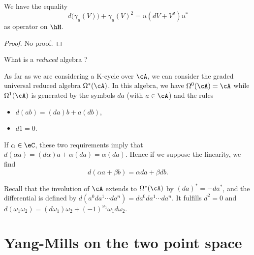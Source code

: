 \begin{proposition}
 We have the equality
\[ 
  d\big( \gamma_u(V) \big)+\gamma_u(V)^2=u(dV+V^2)u^*
\]
as operator on $\hH$.
\end{proposition}
\begin{proof}
No proof.
\end{proof}

\begin{probleme}
	What is a \emph{reduced} algebra ?
\end{probleme}

As far as we are considering a K-cycle over $\cA$, we can consider the graded universal reduced algebra $\Omega^*(\cA)$. In this algebra, we have $\Omega^0(\cA)=\cA$ while $\Omega^1(\cA)$ is generated by the symbols $da$ (with $a\in\cA$) and the rules
\begin{itemize}
\item $d(ab)=(da)b+a(db)$,
\item $d1=0$.
\end{itemize}
If $\alpha\in\eC$, these two requirements imply that $d(\alpha a)=(d\alpha)a+\alpha(da)=\alpha(da)$. Hence if we suppose the linearity, we find
\[ 
  d(\alpha a+\beta b)=\alpha da+\beta db.
\]

Recall that the involution of $\cA$ extends to $\Omega^*(\cA)$ by $(da)^*=-da^*$, and the differential is defined by $d(a^0da^1\cdots da^{n})=da^0da^1\cdots da^{n}$. It fulfills $d^2=0$ and $d(\omega_1\omega_2)=(d\omega_1)\omega_2+(-1)^{\omega_1}\omega_1d\omega_2$.

\section{Yang-Mills on the two point space}

